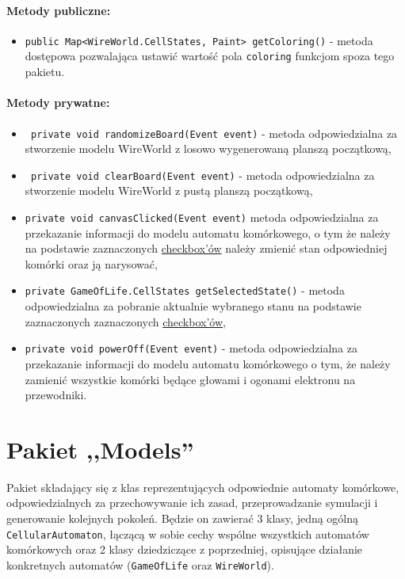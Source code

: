 \documentclass{report}
\begin{document}
\paragraph{Metody publiczne:}
\begin{itemize}
 	\item \texttt{public Map<WireWorld.CellStates, Paint> getColoring()} - metoda dostępowa pozwalająca ustawić wartość pola \texttt{coloring} funkcjom spoza tego pakietu.
\end{itemize}
\paragraph{Metody prywatne:}
\begin{itemize}
 	\item \texttt{ private void randomizeBoard(Event event)} - metoda odpowiedzialna za stworzenie modelu WireWorld z losowo wygenerowaną planszą początkową,
 	\item \texttt{ private void clearBoard(Event event)} - metoda odpowiedzialna za stworzenie modelu WireWorld z pustą planszą początkową,
 	\item \texttt{private void canvasClicked(Event event)} metoda odpowiedzialna za przekazanie informacji do modelu automatu komórkowego, o tym że należy na podstawie zaznaczonych \hyperref[sec:checkbox]{checkbox'ów} należy zmienić stan odpowiedniej komórki oraz ją narysować,
 	\item \texttt{private GameOfLife.CellStates getSelectedState()} - metoda odpowiedzialna za pobranie aktualnie wybranego stanu na podstawie zaznaczonych  zaznaczonych \hyperref[sec:checkbox]{checkbox'ów},
 	\item \texttt{private void powerOff(Event event)} - metoda odpowiedzialna za przekazanie informacji do modelu automatu komórkowego o tym, że należy zamienić wszystkie komórki będące głowami i ogonami elektronu na przewodniki.
\end{itemize}


\section{Pakiet ,,Models''}
Pakiet składający się z klas reprezentujących odpowiednie automaty komórkowe, odpowiedzialnych za przechowywanie ich zasad, przeprowadzanie symulacji i generowanie kolejnych pokoleń. Będzie on zawierać 3 klasy, jedną ogólną \texttt{CellularAutomaton}, łączącą w sobie cechy wspólne wszystkich automatów komórkowych oraz 2 klasy dziedziczące z poprzedniej, opisujące działanie konkretnych automatów (\texttt{GameOfLife} oraz \texttt{WireWorld}).
\end{document}
